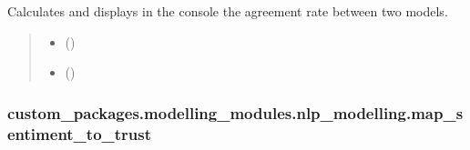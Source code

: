 \documentclass[letterpaper,10pt,english]{sphinxhowto}
\begin{document}
\begin{fulllineitems}
\label{\detokenize{_autosummary/custom_packages.modelling_modules.nlp_modelling.print_models_agreement_percentage:custom_packages.modelling_modules.nlp_modelling.print_models_agreement_percentage}}
\pysigstartsignatures
\pysiglinewithargsret
{}
{\sphinxparamcomma {}}
{}
\pysigstopsignatures
\sphinxAtStartPar
Calculates and displays in the console the agreement rate between two models.
\begin{quote}\begin{description}
\begin{itemize}
\item {} 
\sphinxAtStartPar
{} ()

\item {} 
\sphinxAtStartPar
{} ()

\end{itemize}

\sphinxAtStartPar
{}

\end{description}\end{quote}

\end{fulllineitems}


\sphinxstepscope


\subsubsection{custom\_packages.modelling\_modules.nlp\_modelling.map\_sentiment\_to\_trust}
\label{\detokenize{_autosummary/custom_packages.modelling_modules.nlp_modelling.map_sentiment_to_trust:custom-packages-modelling-modules-nlp-modelling-map-sentiment-to-trust}}\label{\detokenize{_autosummary/custom_packages.modelling_modules.nlp_modelling.map_sentiment_to_trust::doc}}
\end{document}
